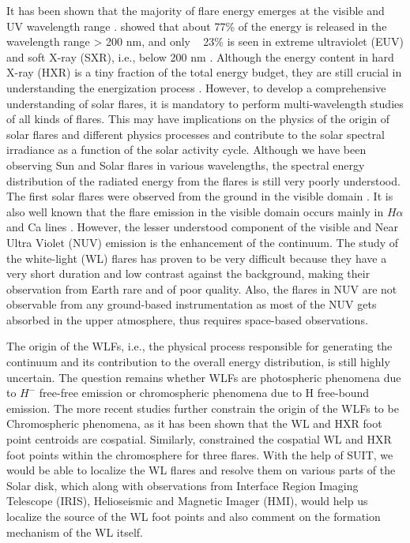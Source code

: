 It has been shown that the majority of flare energy emerges at the visible and UV wavelength range \citep{woods06}. \cite{woods04} showed that about 77\% of the energy is released in the wavelength range > 200 nm, and only ~ 23\% is seen in extreme ultraviolet (EUV) and soft X-ray (SXR), i.e., below 200 nm \citep{Nei_1989,neidig93,kretzschmar11}. Although the energy content in hard X-ray (HXR) is a tiny fraction of the total energy budget, they are still crucial in understanding the energization process \citep{holeman11}. However, to develop a comprehensive understanding of solar flares, it is mandatory to perform multi-wavelength studies of all kinds of flares. This may have implications on the physics of the origin of solar flares and different physics processes and contribute to the solar spectral irradiance as a function of the solar activity cycle. Although we have been observing Sun and Solar flares in various wavelengths, the spectral energy distribution of the radiated energy from the flares is still very poorly understood. The first solar flares were observed from the ground in the visible domain \citep{carrington1859,neidig93}. It is also well known that the flare emission in the visible domain occurs mainly in $H\alpha$ and Ca  lines \citep{canfield90,falchi92,heinzel94}. However, the lesser understood component of the visible and Near Ultra Violet (NUV) emission is the enhancement of the continuum. The study of the white-light (WL) flares has proven to be very difficult because they have a very short duration and low contrast against the background, making their observation from Earth rare and of poor quality. Also, the flares in NUV are not observable from any ground-based instrumentation as most of the NUV gets absorbed in the upper atmosphere, thus requires space-based observations.

The origin of the WLFs, i.e., the physical process responsible for generating the continuum and its contribution to the overall energy distribution, is still highly uncertain. The question remains whether WLFs are photospheric phenomena due to $H^{-}$ free-free emission or chromospheric phenomena due to H free-bound emission. The more recent studies further constrain the origin of the WLFs to be Chromospheric phenomena, as it has been shown that the WL and HXR foot point centroids are cospatial. Similarly, \cite{krucker15} constrained the cospatial WL and HXR foot points within the chromosphere for three flares. With the help of SUIT, we would be able to localize the WL flares and resolve them on various parts of the Solar disk, which along with observations from Interface Region Imaging Telescope (IRIS), Helioseismic and Magnetic Imager (HMI), would help us localize the source of the WL foot points and also comment on the formation mechanism of the WL itself.

